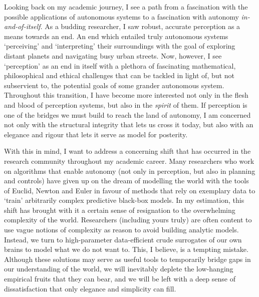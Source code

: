 
Looking back on my academic journey, I see a path from a fascination with the possible applications of autonomous systems to a fascination with autonomy \textit{in-and-of-itself}. As a budding researcher, I saw robust, accurate perception as a means towards an end. An end which entailed truly autonomous systems `perceiving' and `interpreting' their surroundings with the goal of exploring distant planets and navigating busy urban streets. Now, however, I see `perception' as an end in itself with a plethora of fascinating mathematical, philosophical and ethical challenges that can be tackled in light of, but not subservient to, the potential goals of some grander autonomous system. Throughout this transition, I have become more interested not only in the flesh and blood of perception systems, but also in the \textit{spirit} of them. If perception is one of the bridges we must build to reach the land of autonomy, I am concerned not only with the structural integrity that lets us cross it today, but also with an elegance and rigour that lets it serve as model for posterity. 

With this in mind, I want to address a concerning shift that has occurred in the research community throughout my academic career. Many researchers who work on algorithms that enable autonomy (not only in perception, but also in planning and controls) have given up on the dream of modelling the world with the tools of Euclid, Newton and Euler in favour of methods that rely on exemplary data to `train' arbitrarily complex predictive black-box models. In my estimation, this shift has brought with it a certain sense of resignation to the overwhelming complexity of the world. Researchers (including yours truly) are often content to use vague notions of complexity as reason to avoid building analytic models. Instead, we turn to high-parameter data-efficient crude surrogates of our own brains to model what we do not want to. This, I believe, is a tempting mistake. Although these solutions may serve as useful tools to temporarily bridge gaps in our understanding of the world, we will inevitably deplete the low-hanging empirical fruits that they can bear, and we will be left with a deep sense of dissatisfaction that only elegance and simplicity can fill. 

